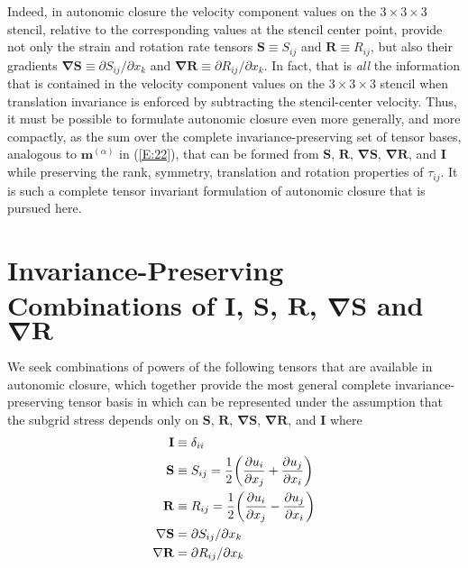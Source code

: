 Indeed, in autonomic closure the velocity component values on the $3 \times 3\times 3$  stencil, relative to the corresponding values at the stencil center point, provide not only the strain and rotation rate tensors $\mathbf{S} \equiv S_{ij}$  and $\mathbf{R} \equiv R_{ij}$, but also their gradients  $\mathbf{\nabla S} \equiv \partial S_{ij}/ \partial x_{k}$ and $\mathbf{\nabla R} \equiv \partial R_{ij}/ \partial x_{k}$. In fact, that is \textit{all} the information that is contained in the velocity component values on the $3 \times 3\times 3$  stencil when translation invariance is enforced by subtracting the stencil-center velocity. Thus, it must be possible to formulate autonomic closure even more generally, and more compactly, as the sum over the complete invariance-preserving set of tensor bases, analogous to  $\mathbf{m}^{(\alpha)}$ in (\ref{E:22}), that can be formed from $\mathbf{S}$, $\mathbf{R}$, $\mathbf{\nabla S}$, $\mathbf{\nabla R}$, and $\mathbf{I}$  while preserving the rank, symmetry, translation and rotation properties of $\tau_{ij}$. It is such a complete tensor invariant formulation of autonomic closure that is pursued here. 

\section{Invariance-Preserving Combinations of $\mathbf{I}$, $\mathbf{S}$, $\mathbf{R}$, $\mathbf{\nabla S}$ and $\mathbf{\nabla R}$}
\label{sec:2}

We seek combinations of powers of the following tensors that are available in autonomic closure, which together provide the most general complete invariance-preserving tensor basis in which   can be represented under the assumption that the subgrid stress depends only on $\mathbf{S}$, $\mathbf{R}$, $\mathbf{\nabla S}$, $\mathbf{\nabla R}$, and $\mathbf{I}$ where
%
\begin{subequations}
\vspace{-0.25in}
\label{E:25}
\begin{align}
 	\mathbf{I} &\equiv \delta_{ii} \\
	\mathbf{S} &\equiv S_{ij} = \frac{1}{2} \bigg( \frac{\partial u_i}{\partial x_j} + \frac{\partial u_j}{ \partial x_i} \bigg)  \\
	\mathbf{R} &\equiv R_{ij} = \frac{1}{2} \bigg( \frac{\partial u_i}{\partial x_j} - \frac{\partial u_j}{ \partial x_i} \bigg) \\
	\mathbf{\nabla S} &= \partial S_{ij}/ \partial x_{k} \\
	\mathbf{\nabla R} &= \partial R_{ij}/ \partial x_{k}
\end{align}
\end{subequations}
%
%    

